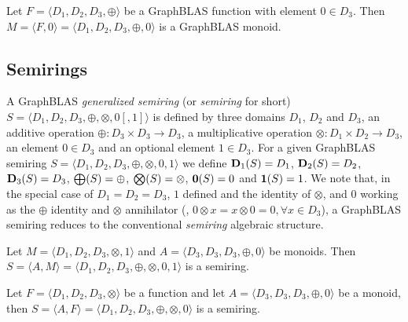 \documentclass[11pt]{extarticle}
\begin{document}
Let $F = \langle D_1,D_2,D_3,\oplus \rangle$ be a GraphBLAS function
with element $0 \in D_3$.  Then $M = \langle F,0 \rangle = \langle
D_1,D_2,D_3,\oplus,0 \rangle$ is a GraphBLAS monoid.

\subsection{Semirings}

A GraphBLAS \emph{generalized semiring} (or \emph{semiring} for short)
$S=\langle D_1,D_2,D_3,\oplus,\otimes,0 [,1] \rangle$ is defined by
three domains $D_1$, $D_2$ and $D_3$, an additive operation $\oplus :
D_3 \times D_3 \rightarrow D_3$, 
a multiplicative operation $\otimes : D_1 \times D_2 \rightarrow
D_3$, an element $0 \in D_3$ and an optional element $1 \in D_3$.
For a given GraphBLAS semiring $S=\langle D_1,
D_2, D_3,\oplus,\otimes,0,1 \rangle$ we define $\bold{D}_1(S) = D_1$,
$\bold{D}_2(S) = D_2$, $\bold{D}_3(S) = D_3$, $\bold{\bigoplus}(S) =
\oplus$, $\bold{\bigotimes}(S) = \otimes$, ${\bf 0}(S) = 0$ and ${\bf 1}(S) =
1$. We note that, in the special case of $D_1 = D_2 = D_3$, $1$ defined and the identity of $\otimes$,
and $0$ working as the $\oplus$ identity and $\otimes$ annihilator (\ie, $0 \otimes x = x
\otimes 0 = 0, \forall x \in D_3$), a GraphBLAS semiring reduces to the
conventional \emph{semiring} algebraic structure.

Let $M = \langle D_1,D_2,D_3,\otimes,1 \rangle$ and
$A = \langle D_3,D_3,D_3,\oplus,0 \rangle$ be monoids.
Then $S= \langle A,M \rangle = \langle D_1,D_2,D_3,\oplus,\otimes,0,1 \rangle$
is a semiring.

Let $F = \langle D_1,D_2,D_3,\otimes \rangle$ be a function
and let $A = \langle D_3,D_3,D_3,\oplus,0 \rangle$ be a monoid,
then $S= \langle A,F \rangle = \langle D_1,D_2,D_3,\oplus,\otimes,0 \rangle$
is a semiring.

 

 
\end{document}
